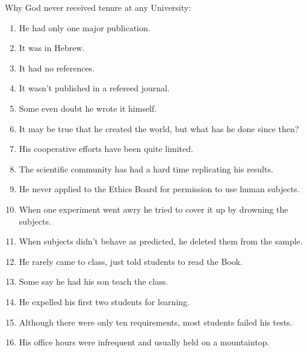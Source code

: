 Why God never received tenure at any University:
\begin{enumerate}
	\item He had only one major publication.

	\item It was in Hebrew. 

	\item It had no references. 

	\item It wasn't published in a refereed journal.

	\item Some even doubt he wrote it himself. 

	\item It may be true that he created the world, but what has he done since then? 

	\item His cooperative efforts have been quite limited. 

	\item The scientific community has had a hard time replicating his results. 

	\item He never applied to the Ethics Board for permission to use human subjects.

	\item When one experiment went awry he tried to cover it up by drowning the subjects. 

	\item When subjects didn't behave as predicted, he deleted them from the sample. 

	\item He rarely came to class, just told students to read the Book. 

	\item Some say he had his son teach the class. 

	\item He expelled his first two students for learning. 

	\item Although there were only ten requirements, most students failed his tests. 

	\item His office hours were infrequent and usually held on a mountaintop.
\end{enumerate}

\begin{center}\underline{\hspace{5 cm}}\end{center}

